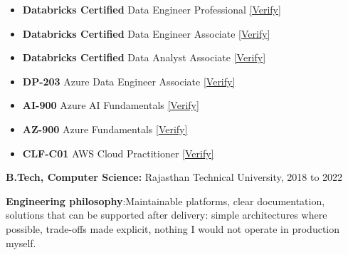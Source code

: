 \documentclass[10pt,a4paper]{article}
\begin{document}
\noindent
\begin{minipage}[t]{0.5\textwidth}
  \begin{itemize}[leftmargin=1.25em, itemsep=1pt, topsep=0.5pt]
    \item \textbf{Databricks Certified} Data Engineer Professional\quad
      \href{https://credentials.databricks.com/164beead-d05f-4519-945d-bda132cb05d6#acc.tH9v6da5}{\textcolor{accent}{[Verify]}}
    \item \textbf{Databricks Certified} Data Engineer Associate\quad
      \href{https://credentials.databricks.com/c5ad9e40-3abf-4089-8180-224a43c5ac01#acc.8Cq6lWhL}{\textcolor{accent}{[Verify]}}
    \item \textbf{Databricks Certified} Data Analyst Associate\quad
      \href{https://credentials.databricks.com/6a04af95-f01c-4762-9d8f-bdd38bdc92af#acc.9cGEfsuL}{\textcolor{accent}{[Verify]}}
    \item \textbf{DP-203} Azure Data Engineer Associate\quad
      \href{https://learn.microsoft.com/api/credentials/share/en-us/GauravSahu-8226/3C183967D3228047?sharingId=20A800C41D48BD0E}{\textcolor{accent}{[Verify]}}
  \end{itemize}
\end{minipage}%
\begin{minipage}[t]{0.5\textwidth}
  \begin{itemize}[leftmargin=1.25em, itemsep=1pt, topsep=0.5pt]
    \item \textbf{AI-900} Azure AI Fundamentals\quad
      \href{https://learn.microsoft.com/api/credentials/share/en-us/GauravSahu-8226/EB0E32C9E76580A8?sharingId=20A800C41D48BD0E}{\textcolor{accent}{[Verify]}}
    \item \textbf{AZ-900} Azure Fundamentals\quad
      \href{https://learn.microsoft.com/api/credentials/share/en-us/GauravSahu-8226/4A85ADBAEE69BD3D?sharingId=20A800C41D48BD0E}{\textcolor{accent}{[Verify]}}
    \item \textbf{CLF-C01} AWS Cloud Practitioner\quad
      \href{https://www.credly.com/badges/e8ec397c-867e-4efa-ba58-0570aee73dd4/}{\textcolor{accent}{[Verify]}}
  \end{itemize}
\end{minipage}


\small\textbf{B.Tech, Computer Science:} Rajasthan Technical
University, 2018 to 2022

\vspace{0.35em}
{\small\textbf{Engineering philosophy}:\enspace Maintainable platforms,
clear documentation, solutions that can be supported after delivery:
simple architectures where possible, trade-offs made explicit, nothing I
would not operate in production myself.}
\end{document}
